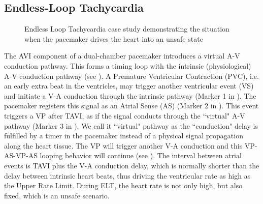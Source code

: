 \subsection{Endless-Loop Tachycardia}
\begin{figure}
\centering
	\caption{Endless Loop Tachycardia case study demonstrating the situation when the pacemaker drives the heart into an unsafe state \cite{vhm_iccps11}}
\end{figure}


The AVI component of a dual-chamber pacemaker introduces a virtual A-V conduction pathway. This forms a timing loop with the intrinsic (physiological) A-V conduction pathway (see ). A Premature Ventricular Contraction (PVC), i.e. an early extra beat in the ventricles, may trigger another ventricular event (VS) and initiate a V-A conduction through the intrinsic pathway (Marker 1 in ). The pacemaker registers this signal as an Atrial Sense (AS) (Marker 2 in ). This event triggers a VP after TAVI, as if the signal conducts through the ``virtual" A-V pathway (Marker 3 in ). We call it ``virtual" pathway as the ``conduction" delay is fulfilled by a timer in the pacemaker instead of a physical signal propagation along the heart tissue. The VP will trigger another V-A conduction and this VP-AS-VP-AS looping behavior will continue (see ). The interval between atrial events is TAVI plus the V-A conduction delay, which is normally shorter than the delay between intrinsic heart beats, thus driving the ventricular rate as high as the Upper Rate Limit. During ELT, the heart rate is not only high, but also fixed, which is an unsafe scenario.

